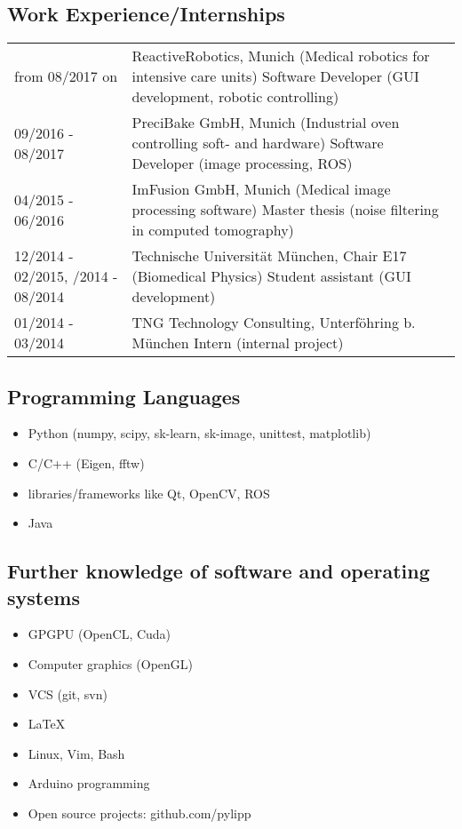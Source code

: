\documentclass[a4paper,10pt]{memoir}
\begin{document}
\subsection*{Work Experience/Internships}
\vspace*{-\baselineskip}
\begin{longtable}{@{}p{} p{}}
  from 08/2017 on &
  ReactiveRobotics, Munich (Medical robotics for intensive care units) \newline
  Software Developer (GUI development, robotic controlling)
  \\
  09/2016 - 08/2017 &
  PreciBake GmbH, Munich (Industrial oven controlling soft- and hardware) \newline 
  Software Developer (image processing, ROS)
  \\
  04/2015 - 06/2016 &
  ImFusion GmbH, Munich (Medical image processing software) \newline 
  Master thesis (noise filtering in computed tomography)
  \\
  12/2014 - 02/2015, \newline
  06/2014 - 08/2014 &
  Technische Universität München, Chair E17 (Biomedical Physics) \newline 
  Student assistant (GUI development)
  \\
  01/2014 - 03/2014 &
  TNG Technology Consulting, Unterföhring b. München \newline 
  Intern (internal project)
\end{longtable}

\subsection*{Programming Languages}
\begin{itemize}
  \item Python (numpy, scipy, sk-learn, sk-image, unittest, matplotlib)
  \item C/C++ (Eigen, fftw)
  \item libraries/frameworks like Qt, OpenCV, ROS
  \item Java 
\end{itemize}

\subsection*{Further knowledge of software and operating systems}
\vspace*{-\baselineskip}
\begin{multicols}{2}
\begin{itemize}
  \item GPGPU (OpenCL, Cuda)
  \item Computer graphics (OpenGL)
  \item VCS (git, svn)
  \item \LaTeX
  \item Linux, Vim, Bash
  \item Arduino programming
  \item Open source projects: github.com/pylipp
\end{itemize}
\end{multicols}
\end{document}
